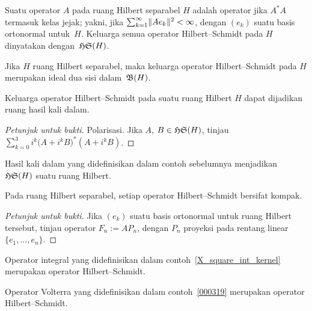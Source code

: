 \begin{defn} Suatu operator $A$ pada ruang Hilbert separabel $H$ adalah operator
 jika $A^*A$ termasuk kelas jejak; yakni, jika $\sum_{k=1}^\infty \lVert Ae_k\rVert^2 < \infty$,
dengan $(e_k)$ suatu basis ortonormal untuk~$H$. Keluarga semua operator Hilbert--Schmidt pada $H$
dinyatakan dengan~$\mathfrak{HS}(H)$.
\end{defn}

\begin{prop} Jika $H$ ruang Hilbert separabel, maka keluarga operator Hilbert--Schmidt pada $H$ merupakan ideal
dua sisi dalam~$\mathfrak{B}(H)$.
\end{prop}

\begin{exam} Keluarga operator Hilbert--Schmidt pada suatu ruang Hilbert $H$ dapat dijadikan ruang hasil kali dalam.
\end{exam}

\begin{proof}[\emph{Petunjuk untuk bukti}] Polarisasi. Jika $A$, $B \in \mathfrak{HS}(H)$,
tinjau $\sum_{k=0}^3 i^k \bigl(A + i^kB\bigr)^*(A + i^kB)$. \ns
\end{proof}

\begin{exam} Hasil kali dalam yang didefinisikan dalam contoh sebelumnya menjadikan $\mathfrak{HS}(H)$ suatu ruang Hilbert.
\end{exam}

\begin{prop} Pada ruang Hilbert separabel, setiap operator Hilbert--Schmidt bersifat kompak.
\end{prop}

\begin{proof}[\emph{Petunjuk untuk bukti}] Jika $(e_k)$ suatu basis ortonormal untuk ruang Hilbert tersebut, tinjau
operator $F_n := AP_n$, dengan $P_n$ proyeksi pada rentang linear $\{e_1, \dots, e_n\}$. \ns
\end{proof}

\begin{exam} Operator integral yang didefinisikan dalam contoh~\ref{X_square_int_kernel} merupakan operator Hilbert--Schmidt.
\end{exam}

\begin{exam}
    Operator Volterra yang didefinisikan dalam contoh~\ref{000319} merupakan operator Hilbert--Schmidt.
\end{exam}











\endinput
